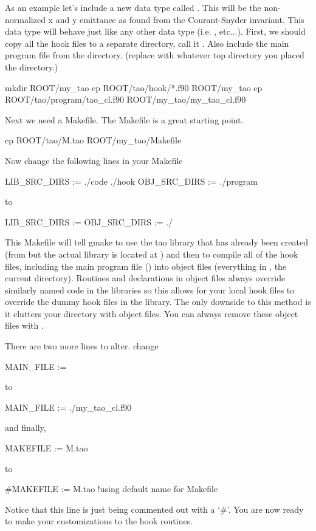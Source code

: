 {{As an example let's include a new data type called
. This will be the non-normalized x and y
emittance as found from the Courant-Snyder invariant. This data type
will behave just like any other data type (i.e.  ,
 etc...). First, we should copy all the hook files to a
separate directory, call it . Also include the main
program file from the  directory.  (replace
 with whatever top directory you placed the 
directory.)
\begin{example}
  mkdir ROOT/my_tao
  cp ROOT/tao/hook/*.f90 ROOT/my_tao
  cp ROOT/tao/program/tao_cl.f90 ROOT/my_tao/my_tao_cl.f90
\end{example}
Next we need a Makefile. The  
Makefile is a great starting point.
\begin{example}
  cp ROOT/tao/M.tao ROOT/my_tao/Makefile
\end{example}
Now change the following lines in your Makefile
\begin{example}
  LIB_SRC_DIRS := ./code ./hook
  OBJ_SRC_DIRS := ./program
\end{example}
to
\begin{example}
  LIB_SRC_DIRS :=
  OBJ_SRC_DIRS := ./
\end{example}
This Makefile will tell gmake to use the tao library that has already
been created (from  but the actual library is located
at )
 and then to compile
all of the hook files, including the main program file
() into object files (everything in , the
current directory).  Routines and declarations in object files always
override similarly named code in the \tao libraries so this allows for
your local hook files to override the dummy hook files in the \tao
library. The only downside to this method is it clutters your
 directory with object files. You can always remove these
object files with .

There are two more lines to alter. change
\begin{example}
  MAIN_FILE :=
\end{example}
to
\begin{example}
  MAIN_FILE := ./my_tao_cl.f90
\end{example}
and finally,
\begin{example}
  MAKEFILE := M.tao
\end{example}
to
\begin{example}
  #MAKEFILE := M.tao !using default name for Makefile
\end{example}
Notice that this line is just being commented out with a `\#'. You are
now ready to make your customizations to the hook routines.

}}

